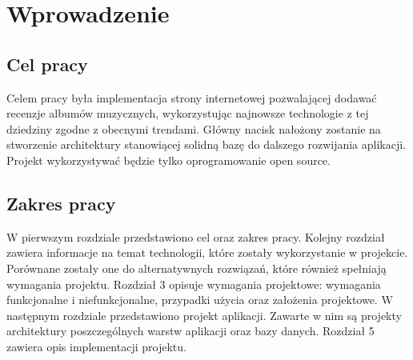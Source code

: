 \chapter{Wprowadzenie}
\label{sec:wprowadzenie}

\section{Cel pracy}
	Celem pracy była implementacja strony internetowej pozwalającej dodawać recenzje albumów muzycznych,
	wykorzystując najnowsze technologie z tej dziedziny zgodne z obecnymi trendami.
	Główny nacisk nałożony zostanie na stworzenie architektury stanowiącej solidną bazę do dalszego rozwijania aplikacji.
	Projekt wykorzystywać będzie tylko oprogramowanie open source.

\section{Zakres pracy}
	W pierwszym rozdziale przedstawiono cel oraz zakres pracy.
	Kolejny rozdział zawiera informacje na temat technologii, które zostały wykorzystanie w projekcie.
	Porównane zostały one do alternatywnych rozwiązań, które również spełniają wymagania projektu.
	Rozdział 3 opisuje wymagania projektowe: wymagania funkcjonalne i niefunkcjonalne, przypadki użycia oraz założenia projektowe.
	W następnym rozdziale przedstawiono projekt aplikacji.
	Zawarte w nim są projekty architektury poszczególnych warstw aplikacji oraz bazy danych.
	Rozdział 5 zawiera opis implementacji projektu.
